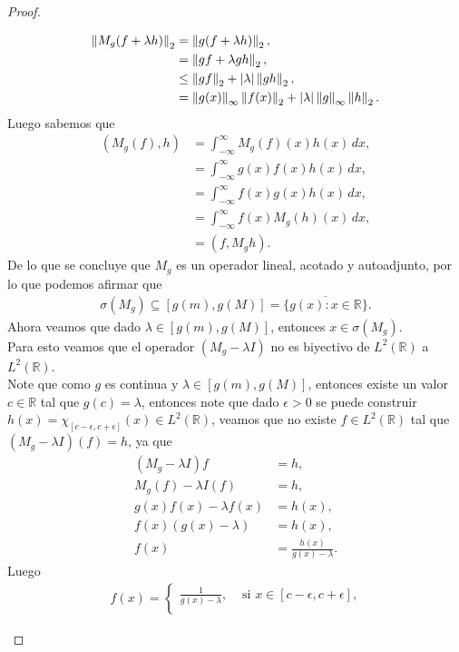 \begin{proof}
\begin{enumerate}
\begin{align*}
        \left\|M_{g}(f+\lambda h)\right\|_{2}&=\left\|g(f+\lambda h)\right\|_{2},\\
        &=\left\|gf+\lambda gh\right\|_{2},\\
        &\leq \left\|gf\right\|_{2}+|\lambda|\left\|gh\right\|_{2},\\
        &=\left\|g(x)\right\|_{\infty}\left\|f(x)\right\|_{2} + |\lambda|\left\|g\right\|_{\infty}\left\|h\right\|_{2}.
      \end{align*}
      Luego sabemos que
      \begin{align*}
        (M_{g}(f),h)&=\int_{-\infty}^{\infty}M_{g}(f)(x)h(x)\, dx,\\
        &=\int_{-\infty}^{\infty}g(x)f(x)h(x)\, dx,\\
        &=\int_{-\infty}^{\infty}f(x)g(x)h(x)\, dx,\\
        &=\int_{-\infty}^{\infty}f(x)M_g(h)(x)\, dx,\\
        &=(f,M_{g}h).
      \end{align*}
      De lo que se concluye que $M_{g}$ es un operador lineal, acotado y autoadjunto, por lo que podemos afirmar que
      \begin{align*}
        \sigma(M_{g})\subseteq [g(m),g(M)]=\overline{\{g(x):x\in\mathbb{R}\}}.
      \end{align*}
      Ahora veamos que dado $\lambda\in [g(m),g(M)]$, entonces $x\in \sigma(M_{g})$.\\
      Para esto veamos que el operador $(M_g-\lambda I)$ no es biyectivo de $L^2(\mathbb{R})$ a $L^{2}(\mathbb{R})$.\\
      Note que como $g$ es continua y $\lambda\in [g(m),g(M)]$, entonces existe un valor $c\in \mathbb{R}$ tal que $g(c)=\lambda$, entonces note que dado $\epsilon>0$ se puede construir $h(x)=\chi_{[c-\epsilon,c+\epsilon]}(x)\in L^2(\mathbb{R})$, veamos que no existe $f\in L^2(\mathbb{R})$ tal que $(M_{g}-\lambda I)(f)=h$, ya que
      \begin{align*}
        (M_{g}-\lambda I)f&=h,\\
        M_{g}(f)-\lambda I(f)&=h,\\
        g(x)f(x)-\lambda f(x)&=h(x),\\
        f(x)(g(x)-\lambda)&=h(x),\\
        f(x)&=\frac{h(x)}{g(x)-\lambda}.
      \end{align*}
      Luego
      \begin{align*}
        f(x)= 
        \begin{cases}
          \frac{1}{g(x)-\lambda}, &\text{ si } x\in [c-\epsilon,c+\epsilon] \text{,} \\

\end{cases}
\end{align*}
\end{enumerate}
\end{proof}
